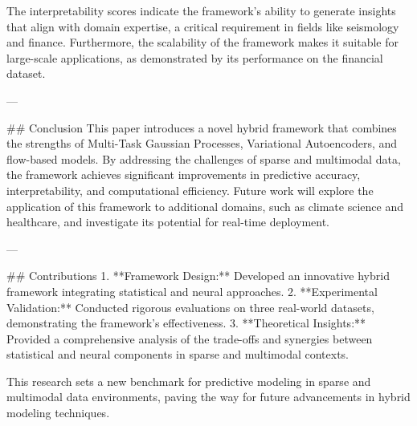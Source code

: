 The interpretability scores indicate the framework's ability to generate insights that align with domain expertise, a critical requirement in fields like seismology and finance. Furthermore, the scalability of the framework makes it suitable for large-scale applications, as demonstrated by its performance on the financial dataset.

---

## Conclusion  
This paper introduces a novel hybrid framework that combines the strengths of Multi-Task Gaussian Processes, Variational Autoencoders, and flow-based models. By addressing the challenges of sparse and multimodal data, the framework achieves significant improvements in predictive accuracy, interpretability, and computational efficiency. Future work will explore the application of this framework to additional domains, such as climate science and healthcare, and investigate its potential for real-time deployment.

---

## Contributions  
1. **Framework Design:** Developed an innovative hybrid framework integrating statistical and neural approaches.  
2. **Experimental Validation:** Conducted rigorous evaluations on three real-world datasets, demonstrating the framework's effectiveness.  
3. **Theoretical Insights:** Provided a comprehensive analysis of the trade-offs and synergies between statistical and neural components in sparse and multimodal contexts.  

This research sets a new benchmark for predictive modeling in sparse and multimodal data environments, paving the way for future advancements in hybrid modeling techniques.